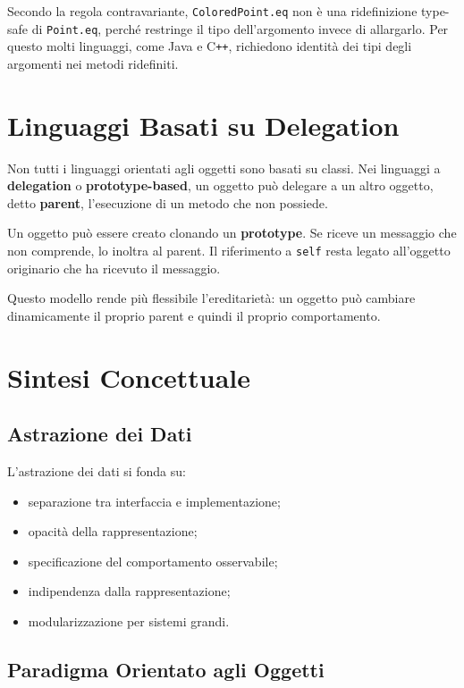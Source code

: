 \documentclass{article}
\begin{document}
Secondo la regola contravariante, \texttt{ColoredPoint.eq} non è una ridefinizione type-safe di \texttt{Point.eq}, perché restringe il tipo dell'argomento invece di allargarlo. Per questo molti linguaggi, come Java e C\texttt{++}, richiedono identità dei tipi degli argomenti nei metodi ridefiniti.

\section{Linguaggi Basati su Delegation}

Non tutti i linguaggi orientati agli oggetti sono basati su classi. Nei linguaggi a \textbf{delegation} o \textbf{prototype-based}, un oggetto può delegare a un altro oggetto, detto \textbf{parent}, l'esecuzione di un metodo che non possiede.

Un oggetto può essere creato clonando un \textbf{prototype}. Se riceve un messaggio che non comprende, lo inoltra al parent. Il riferimento a \texttt{self} resta legato all'oggetto originario che ha ricevuto il messaggio.

Questo modello rende più flessibile l'ereditarietà: un oggetto può cambiare dinamicamente il proprio parent e quindi il proprio comportamento.

\section{Sintesi Concettuale}

\subsection{Astrazione dei Dati}

L'astrazione dei dati si fonda su:
\begin{itemize}
  \item separazione tra interfaccia e implementazione;
  \item opacità della rappresentazione;
  \item specificazione del comportamento osservabile;
  \item indipendenza dalla rappresentazione;
  \item modularizzazione per sistemi grandi.
\end{itemize}

\subsection{Paradigma Orientato agli Oggetti}
\end{document}
